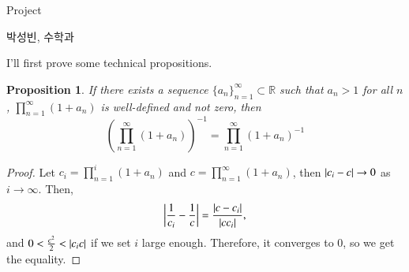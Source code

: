 \documentclass[a4paper, 12pt]{article}
\theoremstyle{Mydefinition}
\theoremstyle{Mytheorem}
\newtheorem{proposition}[statement]{Proposition}
\begin{document}
\thispagestyle{myfirstpage}
\begin{center}
	\Large{Project}
\end{center}
박성빈, 수학과

I'll first prove some technical propositions.
\begin{proposition}\label{Prop:Inverse}
If there exists a sequence $\{a_n\}_{n=1}^\infty\subset \mathbb{R}$ such that $a_n>1$ for all $n$, $\prod_{n=1}^\infty (1+a_n)$ is well-defined and not zero, then
\begin{equation*}
    \left(\prod_{n=1}^\infty (1+a_n)\right)^{-1} = \prod_{n=1}^\infty (1+a_n)^{-1}
\end{equation*}
\end{proposition}
\begin{proof}
Let $c_i = \prod_{n=1}^i (1+a_n)$ and $c = \prod_{n=1}^\infty (1+a_n)$, then $\abs{c_i-c}\rightarrow 0$ as $i\rightarrow \infty$. Then,
\begin{equation*}
    \abs{\frac{1}{c_i}-\frac{1}{c}} = \frac{\abs{c-c_i}}{\abs{cc_i}},
\end{equation*}
and $0<\frac{c^2}{2}<\abs{c_i c}$ if we set $i$ large enough. Therefore, it converges to $0$, so we get the equality.
\end{proof}
\end{document}

